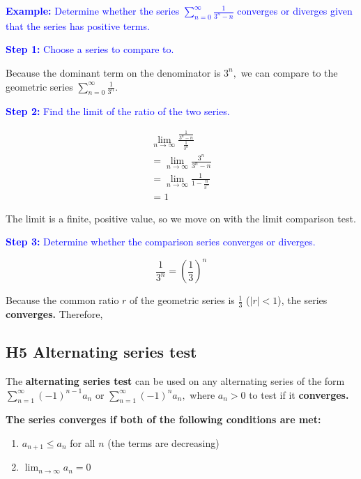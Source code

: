 \documentclass[letterpaper, 12pt]{article}
\newcommand{\example}[1]{\textcolor{blue}{\textbf{Example:} #1}}
\newcommand{\step}[2]{\textcolor{blue}{\textbf{Step #1:} #2}}
\begin{document}
\example{Determine whether the series $\displaystyle \sum_{n=0}^\infty \frac{1}{3^n-n}$ converges or diverges given that the series has positive terms.}

\step{1}{Choose a series to compare to.}

Because the dominant term on the denominator is $3^n,$ we can compare to the geometric series $\displaystyle \sum_{n=0}^\infty \frac{1}{3^n}.$

\step{2}{Find the limit of the ratio of the two series.}

\begin{gather*}
\lim_{n \to \infty} \frac{\frac{1}{3^n-n}}{\frac{1}{3^n}} \\
= \lim_{n \to \infty} \frac{3^n}{3^n - n} \\
= \lim_{n \to \infty} \frac{1}{1 - \frac{n}{3^n}} \\
= 1
\end{gather*}

The limit is a finite, positive value, so we move on with the limit comparison test.

\step{3}{Determine whether the comparison series converges or diverges.}

$$\frac{1}{3^n} = \left(\frac{1}{3}\right)^n$$

Because the common ratio $r$ of the geometric series is $\frac13$ ($|r| < 1$), the series \textbf{converges.} Therefore, 

\subsection*{H5 Alternating series test}

The \textbf{alternating series test} can be used on any alternating series of the form $\displaystyle \sum_{n=1}^\infty (-1)^{n-1} a_n$ or $\displaystyle \sum_{n=1}^\infty (-1)^n a_n,$ where $a_n > 0$ to test if it \textbf{converges.}

\textbf{The series converges if both of the following conditions are met:}

\begin{enumerate}[label=(\alph*)]
    \item $\displaystyle a_{n+1} \leq a_n$ for all $n$ (the terms are decreasing)
    \item $\displaystyle \lim_{n \to \infty} a_n = 0$
    
\end{enumerate}
\end{document}
